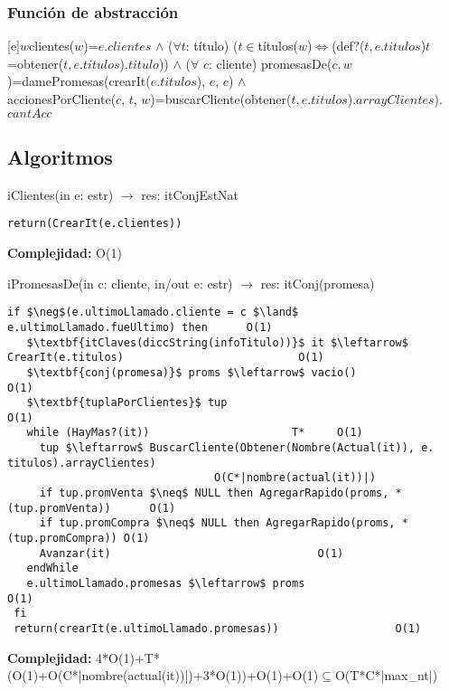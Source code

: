 \subsubsection{Funci\'on de abstracci\'on}
  	 [e]{$w$}{clientes($w$)=$e.clientes$ $\land$ ($\forall t$: t\'itulo) {\large(}$t \in$t\'itulos($w$)$\Leftrightarrow$(def?($t, e.titulos$)\yluego$t$=obtener($t, e.titulos$).$titulo$){\large)} $\land$ ($\forall$ $c$: cliente) promesasDe($c, w$)=damePromesas(crearIt($e.titulos$), $e$, $c$) $\land$ \\accionesPorCliente($c$, $t$, $w$)=buscarCliente(obtener($t, e.titulos$).$arrayClientes$).$cantAcc$}



\subsection{Algoritmos}
\lstset { %
    showstringspaces=false,
}
iClientes(in e: estr) $\rightarrow$ res: itConjEstNat
\begin{lstlisting}[mathescape]
  return(CrearIt(e.clientes))
\end{lstlisting}
\textbf{Complejidad:} O(1)

iPromesasDe(in c: cliente, in/out e: estr) $\rightarrow$ res: itConj(promesa)
\begin{lstlisting}[mathescape]
 if $\neg$(e.ultimoLlamado.cliente = c $\land$ e.ultimoLlamado.fueUltimo) then		O(1)
   $\textbf{itClaves(diccString(infoTitulo))}$ it $\leftarrow$ CrearIt(e.titulos)							O(1)
   $\textbf{conj(promesa)}$ proms $\leftarrow$ vacio() 								O(1)
   $\textbf{tuplaPorClientes}$ tup										O(1)
   while (HayMas?(it))						T*	   O(1)
     tup $\leftarrow$ BuscarCliente(Obtener(Nombre(Actual(it)), e. titulos).arrayClientes)	
     							O(C*|nombre(actual(it))|)
     if tup.promVenta $\neq$ NULL then AgregarRapido(proms, *(tup.promVenta))	   O(1)
     if tup.promCompra $\neq$ NULL then AgregarRapido(proms, *(tup.promCompra)) O(1)
     Avanzar(it)								O(1)
   endWhile
   e.ultimoLlamado.promesas $\leftarrow$ proms						O(1)
 fi
 return(crearIt(e.ultimoLlamado.promesas))					O(1)
\end{lstlisting}
\textbf{Complejidad:} 4*O(1)+T*(O(1)+O(C*|nombre(actual(it))|)+3*O(1))+O(1)+O(1)$\subseteq$O(T*C*|max\_nt|)

